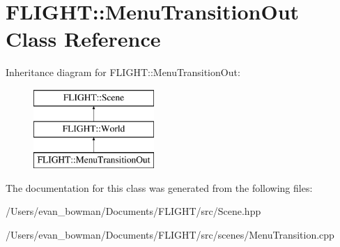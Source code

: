 \hypertarget{class_f_l_i_g_h_t_1_1_menu_transition_out}{}\section{F\+L\+I\+G\+HT\+:\+:Menu\+Transition\+Out Class Reference}
\label{class_f_l_i_g_h_t_1_1_menu_transition_out}
Inheritance diagram for F\+L\+I\+G\+HT\+:\+:Menu\+Transition\+Out\+:\begin{figure}[H]
\begin{center}
\leavevmode
\includegraphics[height=3.000000cm]{class_f_l_i_g_h_t_1_1_menu_transition_out}
\end{center}
\end{figure}


The documentation for this class was generated from the following files\+:\begin{DoxyCompactItemize}
\item 
/\+Users/evan\+\_\+bowman/\+Documents/\+F\+L\+I\+G\+H\+T/src/Scene.\+hpp\item 
/\+Users/evan\+\_\+bowman/\+Documents/\+F\+L\+I\+G\+H\+T/src/scenes/Menu\+Transition.\+cpp\end{DoxyCompactItemize}

